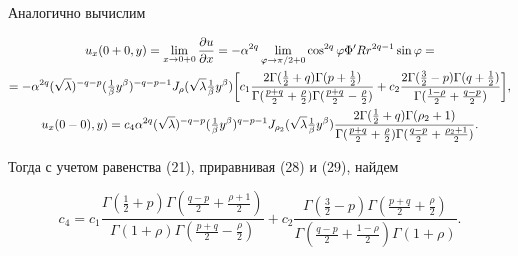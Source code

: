  


Аналогично вычислим 


\begin{gather} 


u_x(0+0,y)=\lim_{x\to0+0}\frac{\partial u}{\partial x}= 


-\alpha^{2q}\lim_{\varphi\to\pi/2+0}\cos^{2q} 


\varphi\Phi' R r^{2q-1}\sin\varphi=\notag \\ 


% 


=-\alpha^{2q}(\sqrt{\lambda})^{-q-p}(\tfrac{1}{\beta} 


y^\beta)^{-q-p-1}J_\rho(\sqrt{\lambda}\tfrac{1}{\beta}y^\beta) 


\bigg[c_1\frac{2\Gamma(\frac{1}{2}+q)\Gamma(p+\frac{1}{2})} 


{\Gamma(\frac{p+q}{2}+\frac{\rho}{2}) 


\Gamma(\frac{p+q}{2}-\frac{\rho}{2})}+c_2 


\frac{2\Gamma(\frac{3}{2}-p)\Gamma(q+\frac{1}{2})} 


{\Gamma(\frac{1-\rho}{2}+\frac{q-p}{2})}\bigg], \\ 


% 


u_x(0-0),y)=c_4\alpha^{2q}(\sqrt{\lambda})^{-q-p} 


(\tfrac{1}{\beta}y^\beta)^{q-p-1}J_{\rho_2} 


(\sqrt{\lambda}\tfrac{1}{\beta}y^\beta) 


\frac{2\Gamma(\frac{1}{2}+q)\Gamma(\rho_2+1)} 


{\Gamma(\frac{p+q}{2}+\frac{\rho}{2}) 


\Gamma(\frac{q-p}{2}+\frac{\rho_2+1}{2})}. 


\end{gather} 


Тогда с учетом равенства (21), приравнивая (28) и (29), найдем 


\begin{equation} 


c_4=c_1\frac{\Gamma(\frac{1}{2}+p) 


\Gamma(\frac{q-p}{2}+\frac{\rho+1}{2})} 


{\Gamma(1+\rho)\Gamma(\frac{p+q}{2}-\frac{\rho}{2})}+c_2 


\frac{\Gamma(\frac{3}{2}-p)\Gamma(\frac{p+q}{2}+\frac{\rho}{2})} 


{\Gamma(\frac{q-p}{2}+\frac{1-\rho}{2})\Gamma(1+\rho)}. 


\end{equation} 


